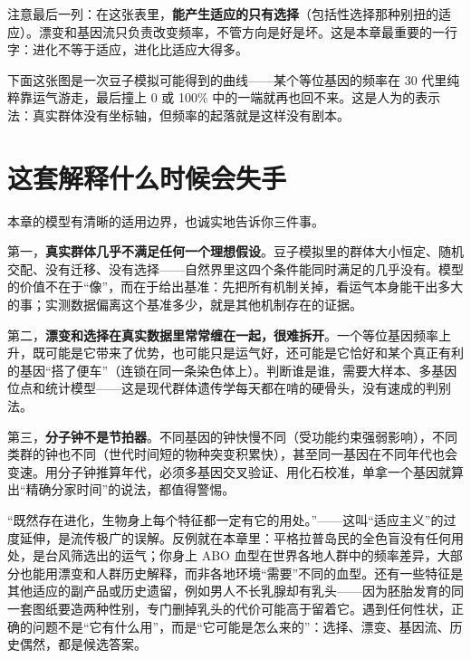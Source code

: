 注意最后一列：在这张表里，\textbf{能产生适应的只有选择}（包括性选择那种别扭的适应）。漂变和基因流只负责改变频率，不管方向是好是坏。这是本章最重要的一行字：进化不等于适应，进化比适应大得多。

下面这张图是一次豆子模拟可能得到的曲线——某个等位基因的频率在 30 代里纯粹靠运气游走，最后撞上 0 或 100\% 中的一端就再也回不来。这是人为的表示法：真实群体没有坐标轴，但频率的起落就是这样没有剧本。

\begin{center}
\end{center}

\section{这套解释什么时候会失手}

本章的模型有清晰的适用边界，也诚实地告诉你三件事。

第一，\textbf{真实群体几乎不满足任何一个理想假设}。豆子模拟里的群体大小恒定、随机交配、没有迁移、没有选择——自然界里这四个条件能同时满足的几乎没有。模型的价值不在于“像”，而在于给出基准：先把所有机制关掉，看运气本身能干出多大的事；实测数据偏离这个基准多少，就是其他机制存在的证据。

第二，\textbf{漂变和选择在真实数据里常常缠在一起，很难拆开}。一个等位基因频率上升，既可能是它带来了优势，也可能只是运气好，还可能是它恰好和某个真正有利的基因“搭了便车”（连锁在同一条染色体上）。判断谁是谁，需要大样本、多基因位点和统计模型——这是现代群体遗传学每天都在啃的硬骨头，没有速成的判别法。

第三，\textbf{分子钟不是节拍器}。不同基因的钟快慢不同（受功能约束强弱影响），不同类群的钟也不同（世代时间短的物种突变积累快），甚至同一基因在不同年代也会变速。用分子钟推算年代，必须多基因交叉验证、用化石校准，单拿一个基因就算出“精确分家时间”的说法，都值得警惕。

\begin{wuqu}
“既然存在进化，生物身上每个特征都一定有它的用处。”——这叫“适应主义”的过度延伸，是流传极广的误解。反例就在本章里：平格拉普岛民的全色盲没有任何用处，是台风筛选出的运气；你身上 ABO 血型在世界各地人群中的频率差异，大部分也能用漂变和人群历史解释，而非各地环境“需要”不同的血型。还有一些特征是其他适应的副产品或历史遗留，例如男人不长乳腺却有乳头——因为胚胎发育的同一套图纸要造两种性别，专门删掉乳头的代价可能高于留着它。遇到任何性状，正确的问题不是“它有什么用”，而是“它可能是怎么来的”：选择、漂变、基因流、历史偶然，都是候选答案。
\end{wuqu}

